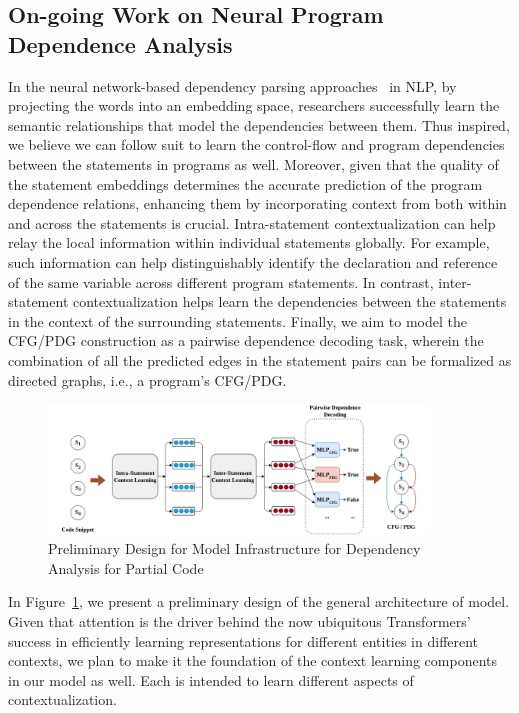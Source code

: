 \subsection{On-going Work on Neural Program Dependence Analysis}
\label{sec:deeppda}

In the neural network-based dependency parsing
approaches~\cite{chen-manning-2014-fast} in NLP, by projecting the
words into an embedding space, researchers successfully learn the
semantic relationships that model the dependencies between them. Thus
inspired, we believe we can follow suit to learn the control-flow and
program dependencies between the statements in programs as
well. Moreover, given that the quality of the statement embeddings
determines the accurate prediction of the program dependence
relations, enhancing them by incorporating context from both within
and across the statements is crucial. Intra-statement
contextualization can help relay the local information within
individual statements globally. For example, such information can help
distinguishably identify the declaration and reference of the same
variable across different program statements. In contrast,
inter-statement contextualization helps learn the dependencies between
the statements in the context of the surrounding statements. Finally,
we aim to model the CFG/PDG construction as a pairwise dependence
decoding task, wherein the combination of all the predicted edges in
the statement pairs can be formalized as directed graphs, i.e., a
program's CFG/PDG.

\begin{figure}[ht]
\begin{center}
    \includegraphics[width=0.9\textwidth]{model-abstract.jpg}
    \caption{Preliminary Design for \tool Model Infrastructure for Dependency Analysis for Partial Code}
    \label{fig:model}
    \vspace{-10pt}
\end{center}
\end{figure}

In Figure~\ref{fig:model}, we present a preliminary design of the
general architecture of \tool model. Given that attention is the
driver behind the now ubiquitous Transformers’~\cite{Vaswani-2017}
success in efficiently learning representations for different entities
in different contexts, we plan to make it the foundation of the
context learning components in our model as well. Each is intended to
learn different aspects of contextualization.


